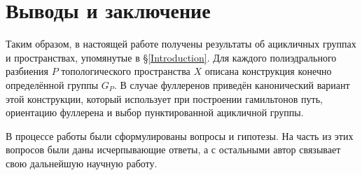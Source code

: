\documentclass[14pt, dvipsnames, twoside]{extarticle}
\theoremstyle{definition}
\theoremstyle{remark}
\begin{document}
\section{Выводы и заключение}

Таким образом, в настоящей работе получены результаты об ацикличных группах и пространствах, упомянутые в \S\ref{Introduction}. Для каждого полиэдрального разбиения $P$ топологического пространства $X$ описана конструкция конечно определённой группы $G_P$. В случае фуллеренов приведён канонический вариант этой конструкции, который использует при построении гамильтонов путь, ориентацию фуллерена и выбор пунктированной ацикличной группы.

В процессе работы были сформулированы вопросы и гипотезы. На часть из этих вопросов были даны исчерпывающие ответы, а с остальными автор связывает свою дальнейшую научную работу.   
























































\newpage


\pagestyle{fancy}
\fancyhf{}
\rhead{\thepage}









\end{document}
